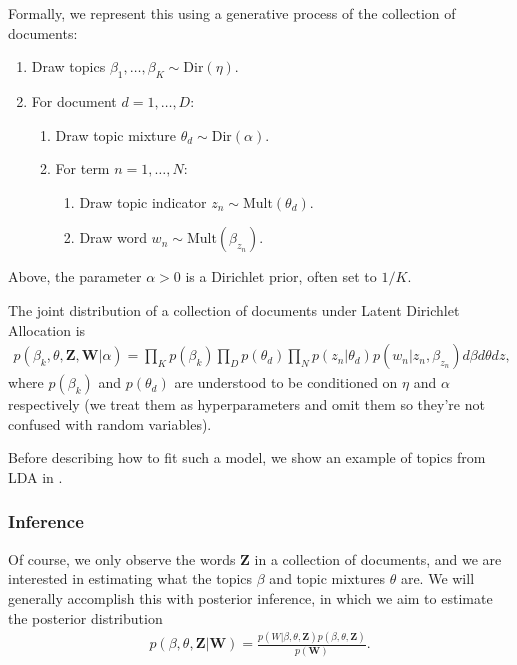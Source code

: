 Formally, we represent this using a generative process of the collection of documents:
\begin{enumerate}
  \item Draw topics $\beta_1, \ldots, \beta_K \sim \mbox{Dir}(\eta)$.
    \item For document $d=1, \ldots, D$:
    \begin{enumerate}
    \item Draw topic mixture $\theta_d \sim \mbox{Dir}(\alpha)$.
    \item For term $n=1, \ldots, N$:
      \begin{enumerate}
      \item Draw topic indicator $z_n \sim \mbox{Mult}(\theta_d)$.
      \item Draw word $w_n \sim \mbox{Mult}(\beta_{z_n})$.
      \end{enumerate}
    \end{enumerate}
\end{enumerate}
Above, the parameter $\alpha > 0$ is a Dirichlet prior, often set to
$1/K$.

The joint distribution of a collection of documents under Latent Dirichlet Allocation is
\begin{align}
  p(\beta_k, \theta, \bm Z, \bm W | \alpha) = 
  \prod_K p(\beta_k)
  \prod_D p(\theta_d) \prod_N p(z_n | \theta_d) p(w_n | z_n, \beta_{z_n}) d\beta d\theta dz,
\end{align}
where $p(\beta_k)$ and $p(\theta_d)$ are understood to be conditioned
on $\eta$ and $\alpha$ respectively (we treat them as hyperparameters
and omit them so they're not confused with random variables).

Before describing how to fit such a model, we show an example of
topics from LDA in \myfig{}.

\begin{figure}
\end{figure}

\subsubsection{Inference}
Of course, we only observe the words $\bm Z$ in a collection of
documents, and we are interested in estimating what the topics $\beta$
and topic mixtures $\theta$ are.  We will generally accomplish this
with posterior inference, in which we aim to estimate the
posterior distribution
\begin{align}
  p(\beta, \theta, \bm Z | \bm W) = \frac{p(W | \beta, \theta, \bm Z) p(\beta, \theta, \bm Z)}{p(\bm W)}. \\
\end{align}

